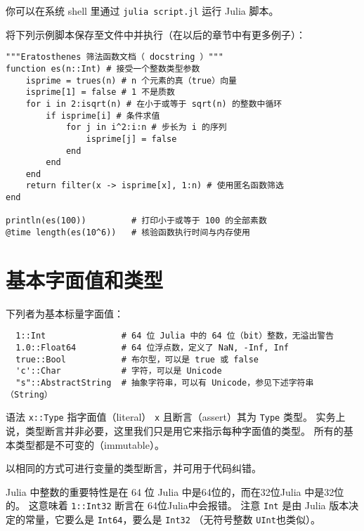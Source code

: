 \documentclass[10pt,a4paper]{article}
\begin{document}
你可以在系统 shell 里通过 \lstinline|julia script.jl| 运行 Julia 脚本。

将下列示例脚本保存至文件中并执行（在以后的章节中有更多例子）：
\begin{lstlisting}
"""Eratosthenes 筛法函数文档（ docstring ）"""
function es(n::Int) # 接受一个整数类型参数
    isprime = trues(n) # n 个元素的真（true）向量
    isprime[1] = false # 1 不是质数
    for i in 2:isqrt(n) # 在小于或等于 sqrt(n) 的整数中循环
        if isprime[i] # 条件求值
            for j in i^2:i:n # 步长为 i 的序列
                isprime[j] = false
            end
        end
    end
    return filter(x -> isprime[x], 1:n) # 使用匿名函数筛选
end

println(es(100))         # 打印小于或等于 100 的全部素数
@time length(es(10^6))   # 核验函数执行时间与内存使用
\end{lstlisting}

\section{基本字面值和类型}
下列者为基本标量字面值：
\begin{lstlisting}
  1::Int               # 64 位 Julia 中的 64 位（bit）整数，无溢出警告
  1.0::Float64         # 64 位浮点数，定义了 NaN, -Inf, Inf
  true::Bool           # 布尔型，可以是 true 或 false
  'c'::Char            # 字符，可以是 Unicode
  "s"::AbstractString  # 抽象字符串，可以有 Unicode，参见下述字符串（String） 
\end{lstlisting}
语法 \lstinline|x::Type| 指字面值（literal） \lstinline|x| 且断言（assert）其为 \lstinline|Type| 类型。
实务上说，类型断言并非必要，这里我们只是用它来指示每种字面值的类型。
所有的基本类型都是不可变的（immutable）。

以相同的方式可进行变量的类型断言，并可用于代码纠错。

Julia 中整数的重要特性是在 64 位 Julia 中是64位的，而在32位Julia 中是32位的。
这意味着 \lstinline|1::Int32| 断言在 64位Julia中会报错。
注意 \lstinline|Int| 是由 Julia 版本决定的常量，它要么是 \lstinline|Int64|，要么是 \lstinline|Int32|
（无符号整数 \lstinline|UInt|也类似）。
\end{document}
